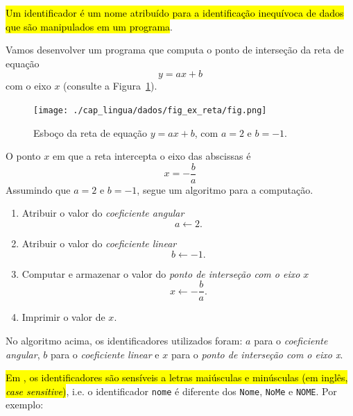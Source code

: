\hl{Um identificador é um nome atribuído para a identificação inequívoca de dados que são manipulados em um programa}.

\begin{ex}\label{cap_lingua_sec_dados:ex:reta}
  Vamos desenvolver um programa que computa o ponto de interseção da reta de equação
  \begin{equation}
    y = ax + b
  \end{equation}
  com o eixo $x$ (consulte a Figura~\ref{cap_lingua_sec_dados:fig:ex_reta}).

  \begin{figure}[H]
    \centering
    \texttt{[image: ./cap\_lingua/dados/fig\_ex\_reta/fig.png]}
    \caption{Esboço da reta de equação $y = ax + b$, com $a=2$ e $b=-1$.}
    \label{cap_lingua_sec_dados:fig:ex_reta}
  \end{figure}

  O ponto $x$ em que a reta intercepta o eixo das abscissas é
  \begin{equation}
    x = -\frac{b}{a}
  \end{equation}
  Assumindo que $a=2$ e $b=-1$, segue um algoritmo para a computação.
  \begin{enumerate}
  \item Atribuir o valor do \emph{coeficiente angular}
    \begin{equation}
      a\leftarrow 2.
    \end{equation}
  \item Atribuir o valor do \emph{coeficiente linear}
    \begin{equation}
      b\leftarrow -1.
    \end{equation}
  \item Computar e armazenar o valor do \emph{ponto de interseção com o eixo $x$}
    \begin{equation}
      x \leftarrow -\frac{b}{a}.
    \end{equation}
  \item Imprimir o valor de $x$.
  \end{enumerate}

  No algoritmo acima, os identificadores utilizados foram: $a$ para o \emph{coeficiente angular}, $b$ para o \emph{coeficiente linear} e $x$ para o \emph{ponto de interseção com o eixo x}.
\end{ex}


\hl{Em {\python}, os identificadores são sensíveis a letras maiúsculas e minúsculas (em inglês, \textit{case sensitive})}, i.e. o identificador \texttt{nome} é diferente dos \texttt{Nome}, \texttt{NoMe} e \texttt{NOME}. Por exemplo:

